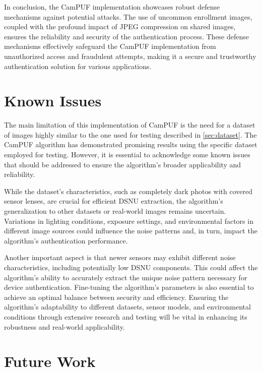 In conclusion, the CamPUF implementation showcases robust defense mechanisms against potential attacks. The use of uncommon enrollment images, coupled with the profound impact of JPEG compression on shared images, ensures the reliability and security of the authentication process. These defense mechanisms effectively safeguard the CamPUF implementation from unauthorized access and fraudulent attempts, making it a secure and trustworthy authentication solution for various applications.

\section{Known Issues}
The main limitation of this implementation of CamPUF is the need for a dataset of images highly similar to the one used for testing described in \ref{sec:dataset}. The CamPUF algorithm has demonstrated promising results using the specific dataset employed for testing. However, it is essential to acknowledge some known issues that should be addressed to ensure the algorithm's broader applicability and reliability.

While the dataset's characteristics, such as completely dark photos with covered sensor lenses, are crucial for efficient DSNU extraction, the algorithm's generalization to other datasets or real-world images remains uncertain. Variations in lighting conditions, exposure settings, and environmental factors in different image sources could influence the noise patterns and, in turn, impact the algorithm's authentication performance. 

Another important aspect is that newer sensors may exhibit different noise characteristics, including potentially low DSNU components. This could affect the algorithm's ability to accurately extract the unique noise pattern necessary for device authentication. Fine-tuning the algorithm's parameters is also essential to achieve an optimal balance between security and efficiency. Ensuring the algorithm's adaptability to different datasets, sensor models, and environmental conditions through extensive research and testing will be vital in enhancing its robustness and real-world applicability.


\section{Future Work}
\label{sec:future_work}

